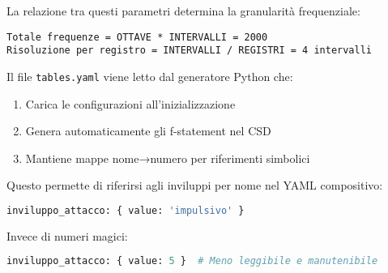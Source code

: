 La relazione tra questi parametri determina la granularità frequenziale:
\begin{lstlisting}
Totale frequenze = OTTAVE * INTERVALLI = 2000
Risoluzione per registro = INTERVALLI / REGISTRI = 4 intervalli
\end{lstlisting}

Il file \texttt{tables.yaml} viene letto dal generatore Python che:
\begin{enumerate}
    \item Carica le configurazioni all'inizializzazione
    \item Genera automaticamente gli f-statement nel CSD
    \item Mantiene mappe nome→numero per riferimenti simbolici
\end{enumerate}
Questo permette di riferirsi agli inviluppi per nome nel YAML compositivo:
\begin{lstlisting}[language=Python]
inviluppo_attacco: { value: 'impulsivo' }
\end{lstlisting}

Invece di numeri magici:
\begin{lstlisting}[language=Python]
inviluppo_attacco: { value: 5 }  # Meno leggibile e manutenibile
\end{lstlisting}
